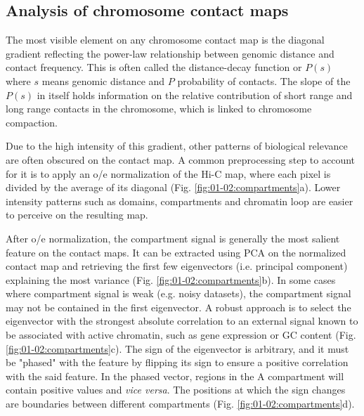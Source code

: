 \subsection{Analysis of chromosome contact maps}

The most visible element on any chromosome contact map is the diagonal gradient reflecting the power-law relationship between genomic distance and contact frequency. This is often called the distance-decay function or $P(s)$ where $s$ means genomic distance and $P$ probability of contacts. The slope of the $P(s)$ in itself holds information on the relative contribution of short range and long range contacts in the chromosome, which is linked to chromosome compaction.

Due to the high intensity of this gradient, other patterns of biological relevance are often obscured on the contact map. A common preprocessing step to account for it is to apply an \acrfull{o/e} normalization of the Hi-C map, where each pixel is divided by the average of its diagonal (Fig. \ref{fig:01-02:compartments}a). Lower intensity patterns such as domains, compartments and chromatin loop are easier to perceive on the resulting map.

After \acrshort{o/e} normalization, the compartment signal is generally the most salient feature on the contact maps. It can be extracted using \acrfull{PCA} on the normalized contact map \cite{lajoieHitchhikerGuideHiC2015} and retrieving the first few eigenvectors (i.e. principal component) explaining the most variance (Fig. \ref{fig:01-02:compartments}b). In some cases where compartment signal is weak (e.g. noisy datasets), the compartment signal may not be contained in the first eigenvector. A robust approach is to select the eigenvector with the strongest absolute correlation to an external signal known to be associated with active chromatin, such as gene expression or GC content \cite{sergeyvenevOpen2cCooltoolsV02021} (Fig. \ref{fig:01-02:compartments}c). The sign of the eigenvector is arbitrary, and it must be "phased" with the feature by flipping its sign to ensure a positive correlation with the said feature. In the phased vector, regions in the A compartment will contain positive values and \textit{vice versa}. The positions at which the sign changes are boundaries between different compartments (Fig. \ref{fig:01-02:compartments}d).

